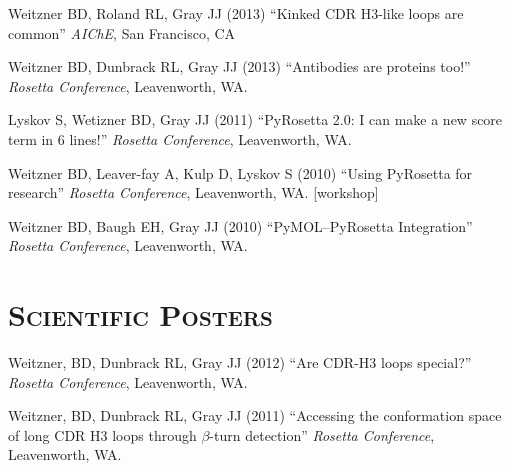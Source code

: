 \documentclass[12pt]{scrartcl}
\newcommand{\smallcapsspacing}[1]{{\addfontfeature{LetterSpace=5.0}#1}}
\renewcommand{\textsc}[1]{\smallcapsspacing{\scshape{#1}}}
\begin{document}
\vspace{0.75\baselineskip}

\noindent Weitzner BD, Roland RL, Gray JJ (2013) ``Kinked CDR H3-like loops are common'' \textit{AIChE}, San Francisco, CA

\vspace{0.75\baselineskip}

\noindent Weitzner BD, Dunbrack RL, Gray JJ (2013) ``Antibodies are proteins too!'' \textit{Rosetta Conference}, Leavenworth, WA.

\vspace{0.75\baselineskip}

\noindent Lyskov S, Wetizner BD, Gray JJ (2011) ``PyRosetta 2.0: I can make a new score term in 6 lines!'' \textit{Rosetta Conference}, Leavenworth, WA.

\vspace{0.75\baselineskip}

\noindent Weitzner BD, Leaver-fay A, Kulp D,  Lyskov S (2010) ``Using PyRosetta for research'' \textit{Rosetta Conference}, Leavenworth, WA. [workshop]

\vspace{0.75\baselineskip}

\noindent Weitzner BD, Baugh EH, Gray JJ (2010) ``PyMOL--PyRosetta Integration'' \textit{Rosetta Conference}, Leavenworth, WA.

\section*{\textsc{Scientific Posters}}
\noindent Weitzner, BD, Dunbrack RL, Gray JJ (2012) ``Are CDR-H3 loops special?'' \textit{Rosetta Conference}, Leavenworth, WA.

\vspace{0.75\baselineskip}

\noindent Weitzner, BD, Dunbrack RL, Gray JJ (2011) ``Accessing the conformation space of long CDR H3 loops through $\beta$-turn detection'' \textit{Rosetta Conference}, Leavenworth, WA.
\end{document}
